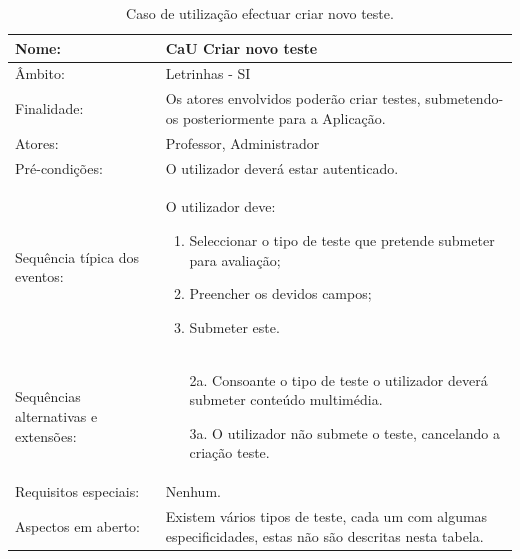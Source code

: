 \documentclass[a4paper]{article}
\begin{document}
			
							\newpage
							\begin {table}[h]
							\begin{tabular}{|p{2cm} p{10cm}|}
								\hline Nome: & CaU Criar novo teste \\ 
								\hline Âmbito: & Letrinhas - SI \\ 
								\hline Finalidade: & Os atores envolvidos poderão criar testes, submetendo-os posteriormente para a Aplicação.  \\ 
								\hline Atores: & Professor, Administrador \\ 
							    \hline Pré-condições: & O utilizador deverá estar autenticado.\\ 
							    \hline Sequência típica dos eventos: &  					
								O utilizador deve:
							    \begin{enumerate}
							    	\item	Seleccionar o tipo de teste que pretende submeter para avaliação;
									\item	Preencher os devidos campos;
									\item	Submeter este.

	
							    \end{enumerate} \\ 
			  				    \hline Sequências alternativas e extensões: & 
			  				    \begin{enumerate}			    	
			  				    	\item[2a.] Consoante o tipo de teste o utilizador deverá submeter conteúdo multimédia.
									\item[3a.] O utilizador não submete o teste, cancelando a criação teste.

	
			
			  				    \end{enumerate}
			  				     \\ 
			  				    \hline Requisitos especiais: & Nenhum.\\ 
			  				    \hline Aspectos em aberto: & Existem vários tipos de teste, cada um com algumas especificidades, estas não são descritas nesta tabela.  \\
								\hline 
							\end{tabular}
							\caption{Caso de utilização efectuar criar novo teste.}
						\end{table} 
\newpage	
\end{document}

